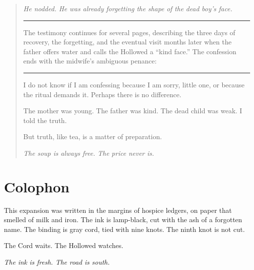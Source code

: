 \documentclass[10pt,twoside]{book}
\newenvironment{storybox}
  {\begin{quote}\itshape\small\setlength{\parskip}{0.5em}}
  {\end{quote}}
\begin{document}
\begin{storybox}
He nodded. He was already forgetting the shape of the dead boy's face.

\vspace{0.5cm}
\noindent\rule{\textwidth}{0.2pt}

The testimony continues for several pages, describing the three days of recovery, the forgetting, and the eventual visit months later when the father offers water and calls the Hollowed a ``kind face.'' The confession ends with the midwife's ambiguous penance:

\vspace{0.5cm}
\noindent\rule{\textwidth}{0.2pt}

I do not know if I am confessing because I am sorry, little one, or because the ritual demands it. Perhaps there is no difference.

The mother was young. The father was kind. The dead child was weak. I told the truth.

But truth, like tea, is a matter of preparation.

\emph{The soup is always free. The price never is.}
\end{storybox}

\chapter*{Colophon}

This expansion was written in the margins of hospice ledgers, on paper that smelled of milk and iron. The ink is lamp-black, cut with the ash of a forgotten name. The binding is gray cord, tied with nine knots. The ninth knot is not cut.

The Cord waits. The Hollowed watches.

\vspace{0.5cm}
\noindent
\textit{The ink is fresh. The road is south.}
\end{document}
